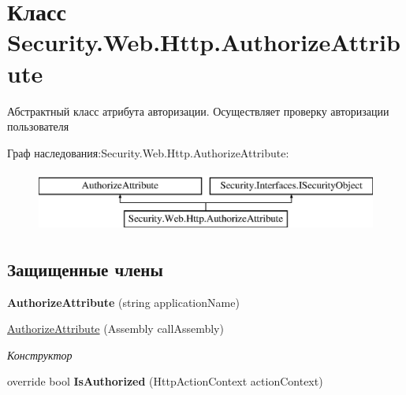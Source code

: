 \hypertarget{class_security_1_1_web_1_1_http_1_1_authorize_attribute}{}\section{Класс Security.\+Web.\+Http.\+Authorize\+Attribute}
\label{class_security_1_1_web_1_1_http_1_1_authorize_attribute}


Абстрактный класс атрибута авторизации. Осуществляет проверку авторизации пользователя  


Граф наследования\+:Security.\+Web.\+Http.\+Authorize\+Attribute\+:\begin{figure}[H]
\begin{center}
\leavevmode
\includegraphics[height=2.000000cm]{df/d67/class_security_1_1_web_1_1_http_1_1_authorize_attribute}
\end{center}
\end{figure}
\subsection*{Защищенные члены}
\begin{DoxyCompactItemize}
\item 
\mbox{\label{class_security_1_1_web_1_1_http_1_1_authorize_attribute_a15e5bd8536a063dcdfc1c951b139c737}} 
{\bfseries Authorize\+Attribute} (string application\+Name)
\item 
\hyperlink{class_security_1_1_web_1_1_http_1_1_authorize_attribute_a35c2f1f6e56c2c322bf9c57a4e3873c0}{Authorize\+Attribute} (Assembly call\+Assembly)
\begin{DoxyCompactList}\small\item\em Конструктор \end{DoxyCompactList}\item 
\mbox{\label{class_security_1_1_web_1_1_http_1_1_authorize_attribute_a9ada1d5893aaf827a783b7943fa0cd88}} 
override bool {\bfseries Is\+Authorized} (Http\+Action\+Context action\+Context)
\end{DoxyCompactItemize}
